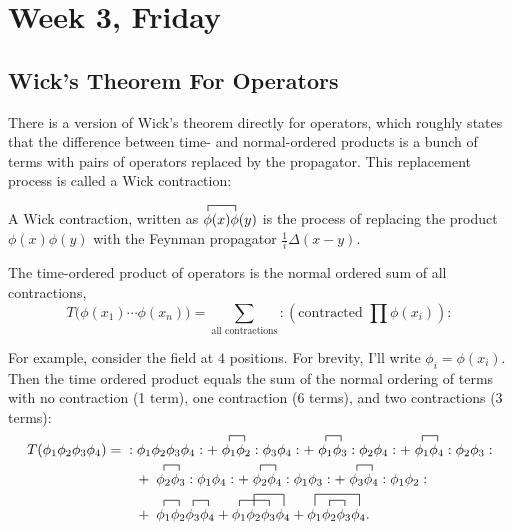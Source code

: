 \documentclass[12pt]{article}
\begin{document}
\section{Week 3, Friday}


\subsection{Wick's Theorem For Operators}

There is a version of Wick's theorem directly for operators, which
roughly states that the difference between time- and normal-ordered
products is a bunch of terms with pairs of operators replaced by the
propagator. This replacement process is called a Wick contraction:
\begin{definition}
  A Wick contraction, written as
  $\contraction{}{\phi}{(x)}{\phi}{}\phi(x) \phi(y)$ is the process of
  replacing the product $\phi(x)\phi(y)$ with the Feynman propagator
  $\tfrac{1}{i}\Delta(x-y)$.
\end{definition}
\begin{theorem}
  The time-ordered product of operators is the normal ordered sum of
  all contractions,
  \begin{equation}
    T\big(\phi(x_1) \cdots \phi(x_n)\big) = 
    \sum_\text{all contractions}
    :\left(\text{contracted }\prod \phi(x_i)\right):
  \end{equation}
\end{theorem}
For example, consider the field at $4$ positions. For brevity, I'll
write $\phi_i = \phi(x_i)$. Then the time ordered product equals the
sum of the normal ordering of terms with no contraction (1 term), one
contraction (6 terms), and two contractions (3 terms):
\begin{equation}
  \begin{split}
    T(\phi_1 \phi_2 \phi_3 \phi_4) =& \;
    :\phi_1 \phi_2 \phi_3 \phi_4: +\;
    \contraction{}{\phi_1}{}{\phi_2}{}\phi_1 \phi_2 :\phi_3 \phi_4: +\;
    \contraction{}{\phi_1}{}{\phi_3}{}\phi_1 \phi_3 :\phi_2 \phi_4: +\;
    \contraction{}{\phi_1}{}{\phi_4}{}\phi_1 \phi_4 :\phi_2 \phi_3: 
    \\ &\quad +\;
    \contraction{}{\phi_2}{}{\phi_3}{}\phi_2 \phi_3 :\phi_1 \phi_4: +\;
    \contraction{}{\phi_2}{}{\phi_4}{}\phi_2 \phi_4 :\phi_1 \phi_3: +\;
    \contraction{}{\phi_3}{}{\phi_4}{}\phi_3 \phi_4 :\phi_1 \phi_2: 
    \\ &\quad +\;
    \contraction{}{\phi_1}{}{\phi_2}
    \contraction{\phi_1 \phi_2}{\phi_3}{}{\phi_4}
    \phi_1 \phi_2 \phi_3 \phi_4 + 
    \contraction{}{\phi_1}{\phi_2}{\phi_3}
    \contraction[2ex]{\phi_1}{\phi_2}{\phi_3}{\phi_4}
    \phi_1 \phi_2 \phi_3 \phi_4 + 
    \contraction[2ex]{}{\phi_1}{\phi_2\phi_3}{\phi_4}
    \contraction{\phi_1}{\phi_2}{}{\phi_3}
    \phi_1 \phi_2 \phi_3 \phi_4.
  \end{split}
\end{equation}
\end{document}
